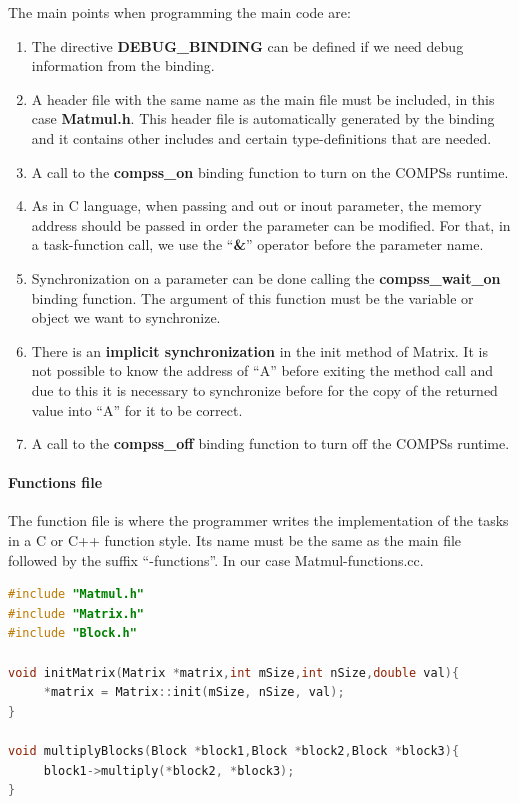 The main points when programming the main code are:
\begin{enumerate}
 \item The directive {\bf DEBUG\_BINDING} can be defined if we need debug information from the binding.
 \item A header file with the same name as the main file must be included, in this case {\bf Matmul.h}. 
       This header file is automatically generated by the binding and it contains other includes and 
       certain type-definitions that are needed.
 \item A call to the {\bf compss\_on} binding function to turn on the COMPSs runtime.
 \item As in C language, when passing and out or inout parameter, the memory address should be passed 
       in order the parameter can be modified. For that, in a task-function call, we use the ``{\bf \&}'' 
       operator before the parameter name.
 \item Synchronization on a parameter can be done calling the {\bf compss\_wait\_on} binding function. 
       The argument of this function must be the variable or object we want to synchronize.
 \item There is an {\bf implicit synchronization} in the init method of Matrix. It is not possible to 
       know the address of ``A'' before exiting the method call and due to this it is necessary to synchronize 
       before for the copy of the returned value into ``A'' for it to be correct.
 \item A call to the {\bf compss\_off} binding function to turn off the COMPSs runtime.
\end{enumerate}


\paragraph{Functions file}
The function file is where the programmer writes the implementation of the tasks in a C or C++ function style. 
Its name must be the same as the main file followed by the suffix ``-functions''. In our case Matmul-functions.cc.

\begin{lstlisting}[language=C++]
#include "Matmul.h"
#include "Matrix.h"
#include "Block.h"

void initMatrix(Matrix *matrix,int mSize,int nSize,double val){
     *matrix = Matrix::init(mSize, nSize, val);
}

void multiplyBlocks(Block *block1,Block *block2,Block *block3){
     block1->multiply(*block2, *block3);
}
\end{lstlisting}

